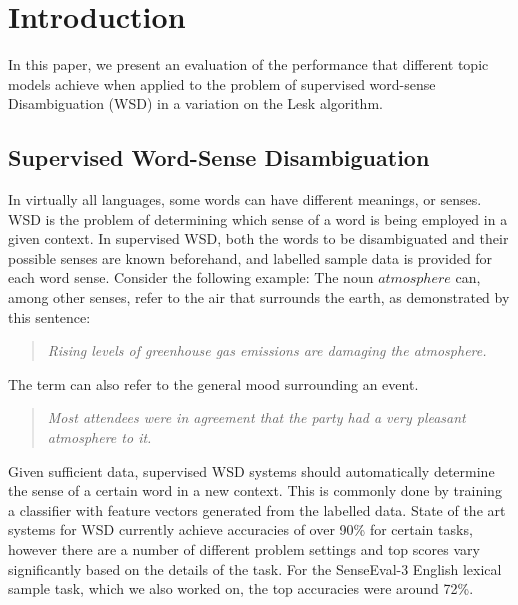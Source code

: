 \section{Introduction}
In this paper, we present an evaluation of the performance that different topic models achieve when applied to the problem of supervised word-sense Disambiguation (WSD) in a variation on the Lesk algorithm. 

\subsection{Supervised Word-Sense Disambiguation}
In virtually all languages, some words can have different meanings, or senses. WSD is the problem of determining  which sense of a word is being employed in a given context. In supervised WSD, both the words to be disambiguated and their possible senses are known beforehand, and labelled sample data is provided for each word sense. Consider the following example: The noun $atmosphere$ can, among other senses, refer to the air that surrounds the earth, as demonstrated by this sentence:\\
\begin{quotation}
\textit{Rising levels of greenhouse gas emissions are damaging the atmosphere.\\}
\end{quotation}
The term can also refer to the general mood surrounding an event. 
\begin{quotation}
\textit{Most attendees were in agreement that the party had a very pleasant atmosphere to it.\\}
\end{quotation}
Given sufficient data, supervised WSD systems should automatically determine the sense of a certain word in a new context. This is commonly done by training a classifier with feature vectors generated from the labelled data. State of the art systems for WSD currently achieve accuracies of over 90\% for certain tasks, however there are a number of different problem settings and top scores vary significantly based on the details of the task. For the SenseEval-3 English lexical sample task, which we also worked on, the top accuracies were around 72\%\cite{senseval3paper}.


